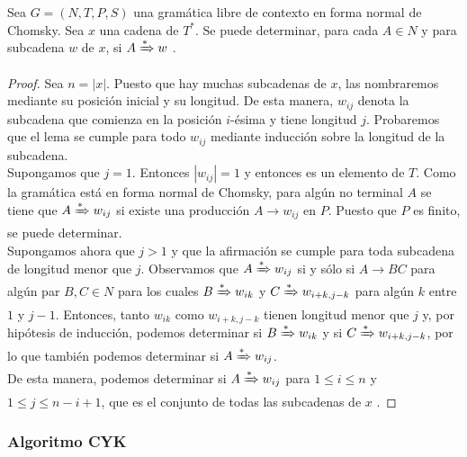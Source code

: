 \begin{lema}\label{lem:validacion}Sea $G=(N,T,P,S)$ una gramática libre de contexto en forma normal de Chomsky. Sea
$x$ una cadena de $T^*$. Se puede determinar, para cada $A\in N$ y para subcadena $w$ de $x$, si 
$A\xRightarrow{*}w$ \cite{kelley_2001}.
\end{lema}
\begin{proof}
Sea $n=|x|$. Puesto que hay muchas subcadenas de $x$, las nombraremos mediante su posición inicial y su longitud. De
esta manera, $w_{ij}$ denota la subcadena que comienza en la posición $i$-ésima y tiene longitud $j$. Probaremos que
el lema se cumple para todo $w_{ij}$ mediante inducción sobre la longitud de la subcadena.\\
Supongamos que $j=1$. Entonces $|w_{ij}|=1$ y entonces es un elemento de $T$. Como la gramática está en forma normal
de Chomsky, para algún no terminal $A$ se tiene que $A\xRightarrow{*}w_{ij}$ si existe una producción $A\to w_{ij}$ en 
$P$. Puesto que $P$ es finito, se puede determinar.\\
Supongamos ahora que $j>1$ y que la afirmación se cumple para toda subcadena de longitud menor que $j$. Observamos que
$A\xRightarrow{*}w_{ij}$ si y sólo si $A\to BC$ para algún par $B,C\in N$ para los cuales $B\xRightarrow{*}w_{ik}$ y
$C\xRightarrow{*}w_{i+k,j-k}$ para algún $k$ entre $1$ y $j-1$. Entonces, tanto $w_{ik}$ como $w_{i+k,j-k}$ tienen
longitud menor que $j$ y, por hipótesis de inducción, podemos determinar si $B\xRightarrow{*}w_{ik}$ y si 
$C\xRightarrow{*}w_{i+k,j-k}$, por lo que también podemos determinar si $A\xRightarrow{*}w_{ij}$. \\
De esta manera, podemos determinar si $A\xRightarrow{*}w_{ij}$ para $1\leq i\leq n$ y $1\leq j\leq n-i+1$, que es el
conjunto de todas las subcadenas de $x$ \cite{kelley_2001}.
\end{proof}

\subsubsection*{Algoritmo CYK}

